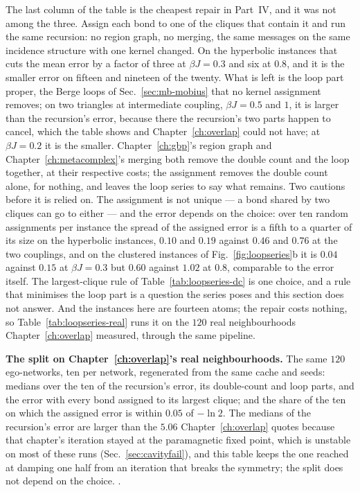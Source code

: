 The last column of the table is the cheapest repair in Part~IV, and it was
not among the three. Assign each bond to one of the cliques that contain it
and run the same recursion: no region graph, no merging, the same messages
on the same incidence structure with one kernel changed. On the hyperbolic
instances that cuts the mean error by a factor of three at $\beta J=0.3$
and six at $0.8$, and it is the smaller error on fifteen and nineteen of
the twenty. What is left is the loop part proper, the Berge loops of
Sec.~\ref{sec:mb-mobius} that no kernel assignment removes; on two
triangles at intermediate coupling, $\beta J=0.5$ and $1$, it is larger
than the recursion's error, because there the recursion's two parts happen
to cancel, which the table shows and Chapter~\ref{ch:overlap} could not
have; at $\beta J=0.2$ it is the smaller. Chapter~\ref{ch:gbp}'s region
graph and Chapter~\ref{ch:metacomplex}'s merging both remove the double
count and the loop together, at their respective costs; the assignment
removes the double count alone, for nothing, and leaves the loop series to
say what remains. Two cautions before it is relied on. The assignment is
not unique --- a bond shared by two cliques can go to either --- and the
error depends on the choice: over ten random assignments per instance the
spread of the assigned error is a fifth to a quarter of its size on the
hyperbolic instances, $0.10$ and $0.19$ against $0.46$ and $0.76$ at the
two couplings, and on the clustered instances of Fig.~\ref{fig:loopseries}b
it is $0.04$ against $0.15$ at $\beta J=0.3$ but $0.60$ against $1.02$ at
$0.8$, comparable to the error itself. The largest-clique rule of
Table~\ref{tab:loopseries-dc} is one choice, and a rule that minimises the
loop part is a question the series poses and this section does not
answer. And the instances here are fourteen atoms; the repair costs
nothing, so Table~\ref{tab:loopseries-real} runs it on the $120$ real
neighbourhoods Chapter~\ref{ch:overlap} measured, through the same
pipeline.

\begin{table}[tb]
\centering\small
\begin{adjustbox}{max width=\linewidth}

\end{adjustbox}
\caption{\textbf{The split on Chapter~\ref{ch:overlap}'s real
neighbourhoods.} The same $120$ ego-networks, ten per network, regenerated
from the same cache and seeds: medians over the ten of the recursion's
error, its double-count and loop parts, and the error with every bond
assigned to its largest clique; and the share of the ten on which the
assigned error is within $0.05$ of $-\ln2$. The medians of the recursion's
error are larger than the $5.06$ Chapter~\ref{ch:overlap} quotes because
that chapter's iteration stayed at the paramagnetic fixed point, which is
unstable on most of these runs (Sec.~\ref{sec:cavityfail}), and this table
keeps the one reached at damping one half from an iteration that breaks the
symmetry; the split does not depend on the choice. .}
\label{tab:loopseries-real}
\end{table}

